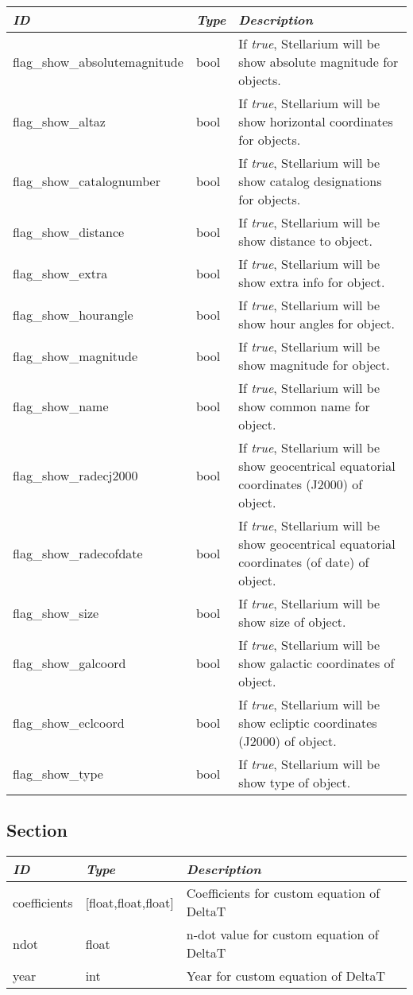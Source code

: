 \begin{longtabu} to \textwidth {l|l|X}
\toprule
\emph{ID} & \emph{Type} & \emph{Description}\tabularnewline
\midrule
flag\_show\_absolutemagnitude & bool & If \emph{true},
Stellarium will be show absolute magnitude for objects.\tabularnewline
\midrule
flag\_show\_altaz & bool & If \emph{true}, Stellarium will be
show horizontal coordinates for objects.\tabularnewline
\midrule
flag\_show\_catalognumber & bool & If \emph{true}, Stellarium
will be show catalog designations for objects.\tabularnewline
\midrule
flag\_show\_distance & bool & If \emph{true}, Stellarium will
be show distance to object.\tabularnewline
\midrule
flag\_show\_extra & bool & If \emph{true}, Stellarium will be
show extra info for object.\tabularnewline
\midrule
flag\_show\_hourangle & bool & If \emph{true}, Stellarium will
be show hour angles for object.\tabularnewline
\midrule
flag\_show\_magnitude & bool & If \emph{true}, Stellarium will
be show magnitude for object.\tabularnewline
\midrule
flag\_show\_name & bool & If \emph{true}, Stellarium will be
show common name for object.\tabularnewline
\midrule
flag\_show\_radecj2000 & bool & If \emph{true}, Stellarium
will be show geocentrical equatorial coordinates (J2000) of
object.\tabularnewline
\midrule
flag\_show\_radecofdate & bool & If \emph{true}, Stellarium
will be show geocentrical equatorial coordinates (of date) of
object.\tabularnewline
\midrule
flag\_show\_size & bool & If \emph{true}, Stellarium will be
show size of object.\tabularnewline
\midrule
flag\_show\_galcoord & bool & If \emph{true}, Stellarium will
be show galactic coordinates of object.\tabularnewline
\midrule
flag\_show\_eclcoord & bool & If \emph{true}, Stellarium will
be show ecliptic coordinates (J2000) of object.\tabularnewline
\midrule
flag\_show\_type & bool & If \emph{true}, Stellarium will be
show type of object.\tabularnewline
\bottomrule
\end{longtabu}

\subsection{Section }\label{section-custom-time-correction}

\begin{longtabu} to \textwidth {l|l|X}
\toprule
\emph{ID} & \emph{Type} & \emph{Description}\tabularnewline
\midrule
coefficients & {[}float,float,float{]} & Coefficients for
custom equation of DeltaT\tabularnewline
\midrule
ndot & float & n-dot value for custom equation of
DeltaT\tabularnewline
\midrule
year & int & Year for custom equation of DeltaT\tabularnewline
\bottomrule
\end{longtabu}


